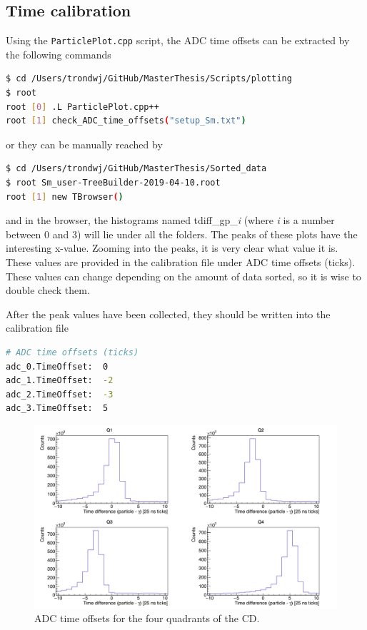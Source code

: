 \documentclass[twoside,english]{uiofysmaster/uiofysmaster}
\begin{document}
\subsection{Time calibration}


Using the \texttt{ParticlePlot.cpp} script, the ADC time offsets can be extracted by the following commands
\begin{lstlisting}[language=sh]
$ cd /Users/trondwj/GitHub/MasterThesis/Scripts/plotting
$ root
root [0] .L ParticlePlot.cpp++
root [1] check_ADC_time_offsets("setup_Sm.txt")
\end{lstlisting}
or they can be manually reached by
\begin{lstlisting}[language=sh]
$ cd /Users/trondwj/GitHub/MasterThesis/Sorted_data
$ root Sm_user-TreeBuilder-2019-04-10.root
root [1] new TBrowser()
\end{lstlisting}
and in the browser, the histograms named tdiff\_gp\_\textit{i} (where \textit{i} is a number between 0 and 3) will lie under all the folders. The peaks of these plots have the interesting x-value. Zooming into the peaks, it is very clear what value it is. These values are provided in the calibration file under ADC time offsets (ticks). These values can change depending on the amount of data sorted, so it is wise to double check them.

After the peak values have been collected, they should be written into the calibration file
\begin{lstlisting}[language=sh]
# ADC time offsets (ticks)
adc_0.TimeOffset:  0
adc_1.TimeOffset:  -2
adc_2.TimeOffset:  -3
adc_3.TimeOffset:  5
\end{lstlisting}

\begin{figure}[ht]
	\centering
	\includegraphics[width=\textwidth]{../Plots/plotting/tdiff_gp_0-3-user.png}
	\caption{ADC time offsets for the four quadrants of the CD.}
	\label{fig:ADC_dt}
\end{figure}
\end{document}
